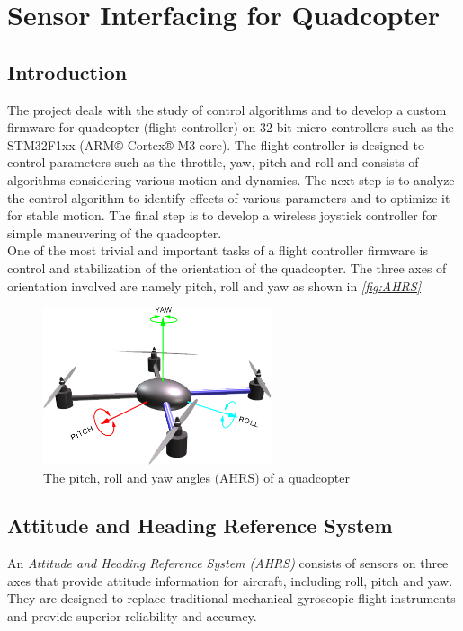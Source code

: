 \documentclass[a4paper,12pt,oneside]{book}
\begin{document}
\chapter[Sensor Interfacing for Quadcopter]{Sensor Interfacing for Quadcopter}
\section{Introduction}
The project deals with the study of control algorithms and to develop a custom firmware for quadcopter (flight controller) on 32-bit micro-controllers such as the STM32F1xx (ARM® Cortex®-M3 core). The flight controller is designed to control parameters such as the throttle, yaw, pitch and roll and consists of algorithms considering various motion and dynamics. The next step is to analyze the control algorithm to identify effects of various parameters and to optimize it for stable motion. The final step is to develop a wireless joystick controller for simple maneuvering of the quadcopter.\\ 

One of the most trivial and important tasks of a flight controller firmware is control and stabilization of the orientation of the quadcopter. The three axes of orientation involved are namely pitch, roll and yaw as shown in \textit{\autoref{fig:AHRS}}\\

\begin{figure}[!htb]
\centering
\includegraphics[width=0.6\textwidth]{images/AHRS}
\caption{The pitch, roll and yaw angles (AHRS) of a quadcopter\cite{ardu}}
\label{fig:AHRS}
\end{figure}

\section{Attitude and Heading Reference System}
An \textit{Attitude and Heading Reference System (AHRS)} consists of sensors on three axes that provide attitude information for aircraft, including roll, pitch and yaw. They are designed to replace traditional mechanical gyroscopic flight instruments and provide superior reliability and accuracy.\cite{ahrswiki}\\
\end{document}
